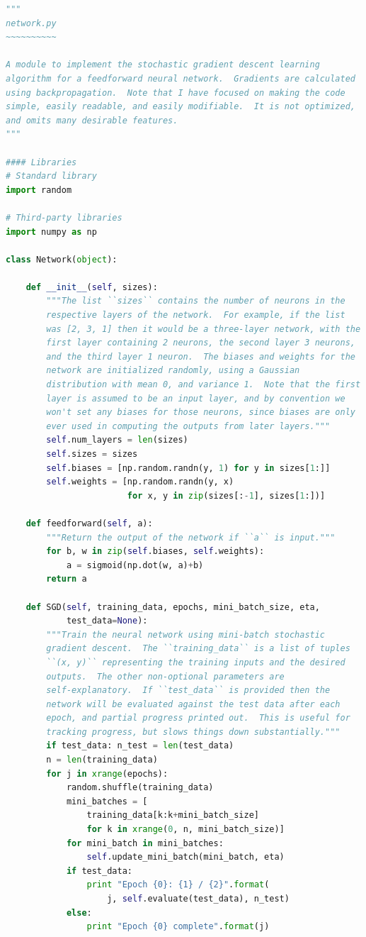 \begin{lstlisting}[language=Python]
"""
network.py
~~~~~~~~~~

A module to implement the stochastic gradient descent learning
algorithm for a feedforward neural network.  Gradients are calculated
using backpropagation.  Note that I have focused on making the code
simple, easily readable, and easily modifiable.  It is not optimized,
and omits many desirable features.
"""

#### Libraries
# Standard library
import random

# Third-party libraries
import numpy as np

class Network(object):

    def __init__(self, sizes):
        """The list ``sizes`` contains the number of neurons in the
        respective layers of the network.  For example, if the list
        was [2, 3, 1] then it would be a three-layer network, with the
        first layer containing 2 neurons, the second layer 3 neurons,
        and the third layer 1 neuron.  The biases and weights for the
        network are initialized randomly, using a Gaussian
        distribution with mean 0, and variance 1.  Note that the first
        layer is assumed to be an input layer, and by convention we
        won't set any biases for those neurons, since biases are only
        ever used in computing the outputs from later layers."""
        self.num_layers = len(sizes)
        self.sizes = sizes
        self.biases = [np.random.randn(y, 1) for y in sizes[1:]]
        self.weights = [np.random.randn(y, x)
                        for x, y in zip(sizes[:-1], sizes[1:])]

    def feedforward(self, a):
        """Return the output of the network if ``a`` is input."""
        for b, w in zip(self.biases, self.weights):
            a = sigmoid(np.dot(w, a)+b)
        return a

    def SGD(self, training_data, epochs, mini_batch_size, eta,
            test_data=None):
        """Train the neural network using mini-batch stochastic
        gradient descent.  The ``training_data`` is a list of tuples
        ``(x, y)`` representing the training inputs and the desired
        outputs.  The other non-optional parameters are
        self-explanatory.  If ``test_data`` is provided then the
        network will be evaluated against the test data after each
        epoch, and partial progress printed out.  This is useful for
        tracking progress, but slows things down substantially."""
        if test_data: n_test = len(test_data)
        n = len(training_data)
        for j in xrange(epochs):
            random.shuffle(training_data)
            mini_batches = [
                training_data[k:k+mini_batch_size]
                for k in xrange(0, n, mini_batch_size)]
            for mini_batch in mini_batches:
                self.update_mini_batch(mini_batch, eta)
            if test_data:
                print "Epoch {0}: {1} / {2}".format(
                    j, self.evaluate(test_data), n_test)
            else:
                print "Epoch {0} complete".format(j)


\end{lstlisting}
